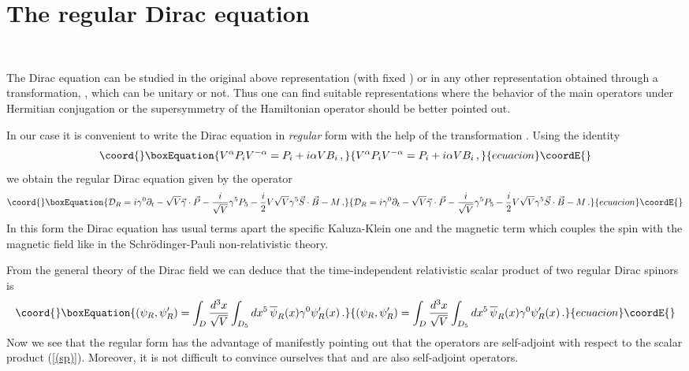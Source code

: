 \documentclass[a4paper,12pt]{article}
\begin{document}
\section{The regular Dirac equation}
\

The Dirac equation can be studied in the original above representation 
(with fixed \coordHE{}) or 
in any other representation obtained through a transformation, \coordHE{}, which can be unitary or not. Thus one can find suitable representations 
where the  behavior of the main operators under Hermitian conjugation or the 
supersymmetry of the Hamiltonian operator should be better pointed out. 

In our case it is convenient to write the Dirac equation in {\em regular} form 
with the help of the transformation \coordHE{} \cite{DIRAC}. 
Using the identity \cite{CH}
\begin{equation}\coord{}\boxEquation{\label{idCH}
V^{\alpha}P_{i}V^{-\alpha}=P_{i}+i\alpha V B_{i}\,,
}{V^{\alpha}P_{i}V^{-\alpha}=P_{i}+i\alpha V B_{i}\,,
}{ecuacion}\coordE{}\end{equation}
we obtain the regular Dirac equation  \coordHE{} given by  
the operator   
\begin{equation}\coord{}\boxEquation{\label{(rde)}
{\cal D}_{R}=i\gamma^{0}\partial_{t} - \sqrt{V}\vec{\gamma}\cdot\vec{P}
-\frac{i}{\sqrt{V}}\gamma^{5}P_{5}-
\frac{i}{2} V\sqrt{V}\gamma^{5}\vec{S}\cdot\vec{B}- M\,.
}{{\cal D}_{R}=i\gamma^{0}\partial_{t} - \sqrt{V}\vec{\gamma}\cdot\vec{P}
-\frac{i}{\sqrt{V}}\gamma^{5}P_{5}-
\frac{i}{2} V\sqrt{V}\gamma^{5}\vec{S}\cdot\vec{B}- M\,.
}{ecuacion}\coordE{}\end{equation}
In this form the Dirac equation  has usual terms apart  the specific 
Kaluza-Klein one and the magnetic term which 
couples the spin with the magnetic field like in the Schr\" odinger-Pauli 
non-relativistic theory. 

From the general theory of the Dirac field \cite{BD,DKK} 
we can deduce that the time-independent relativistic scalar product of two 
regular Dirac spinors is 
\begin{equation}\coord{}\boxEquation{\label{(sp)}
(\psi_{R},\psi_{R}')=\int_{D}\frac{d^{3}x}{\sqrt{V}}\int_{D_{5}}dx^{5}\,
\overline{\psi}_{R}(x)\gamma^{0}\psi_{R}'(x)\,. 
}{(\psi_{R},\psi_{R}')=\int_{D}\frac{d^{3}x}{\sqrt{V}}\int_{D_{5}}dx^{5}\,
\overline{\psi}_{R}(x)\gamma^{0}\psi_{R}'(x)\,. 
}{ecuacion}\coordE{}\end{equation}
Now we see that the regular form has the advantage of manifestly pointing out 
that the operators \coordHE{} are 
self-adjoint with respect to the scalar product (\ref{(sp)}). Moreover, it is 
not difficult to convince ourselves that  \coordHE{} and \coordHE{} are also 
self-adjoint operators. 
\end{document}
